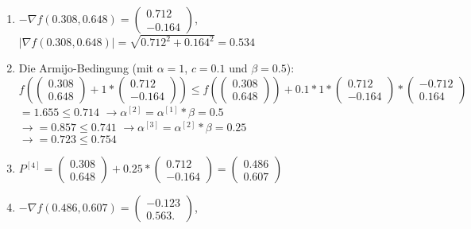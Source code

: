 \documentclass[a4paper, 11pt]{article}
\begin{document}
\begin{enumerate}
	\item
	$-{\nabla}f(0.308,0.648) = \left( \begin{array}{c} 0.712 \\ -0.164 \end{array} \right)$, \\
	$|{\nabla}f(0.308,0.648)| = \sqrt{0.712^2+0.164^2} = 0.534$
	\item
	Die Armijo-Bedingung (mit $\alpha = 1$, $c = 0.1$ und $\beta = 0.5$):\\
	$f( \left( \begin{array}{c} 0.308 \\ 0.648 \end{array} \right) + 1 * \left( \begin{array}{c} 0.712 \\ -0.164 \end{array} \right)) \leq f(\left( \begin{array}{c} 0.308 \\ 0.648 \end{array} \right)) + 0.1 * 1 *  \left( \begin{array}{c} 0.712 \\ -0.164 \end{array} \right) * \left( \begin{array}{c} -0.712 \\ 0.164 \end{array} \right)$ \\
	$= 1.655 \leq 0.714$
	$\rightarrow \alpha^{[2]} = \alpha^{[1]} * \beta = 0.5$ \\
	$\rightarrow = 0.857 \leq 0.741$
	$\rightarrow \alpha^{[3]} = \alpha^{[2]} * \beta = 0.25$ \\
	$\rightarrow = 0.723 \leq 0.754$
	\item
	$P^{[4]} = \left( \begin{array}{c} 0.308 \\ 0.648 \end{array} \right) + 0.25 * \left( \begin{array}{c} 0.712 \\ -0.164 \end{array} \right) = \left( \begin{array}{c} 0.486 \\ 0.607 \end{array} \right)$
	\item
	$-{\nabla}f(0.486,0.607) = \left( \begin{array}{c} -0.123 \\ 0.563. \end{array} \right)$, \\

\end{enumerate}
\end{document}
